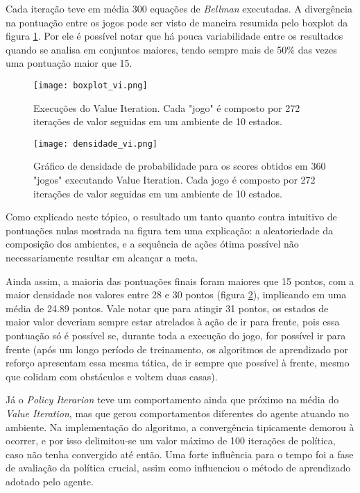 \documentclass[letterpaper]{article} %
\begin{document}
Cada iteração teve em média 300 equações de \textit{Bellman} executadas. A divergência na pontuação entre os jogos pode ser visto de maneira resumida pelo boxplot da figura \ref{fig:boxplot_vi}. Por ele é possível notar que há pouca variabilidade entre os resultados quando se analisa em conjuntos maiores, tendo sempre mais de 50\% das vezes uma pontuação maior que 15.

\begin{figure}[h]
	\center
	\texttt{[image: boxplot\_vi.png]}
    \caption{Execuções do Value Iteration. Cada "jogo" é composto por 272 iterações de valor seguidas em um ambiente de 10 estados.}
    \label{fig:boxplot_vi}
\end{figure}

\begin{figure}[h]
	\center
	\texttt{[image: densidade\_vi.png]}
    \caption{Gráfico de densidade de probabilidade para os scores obtidos em 360 "jogos" executando Value Iteration. Cada jogo é composto por 272 iterações de valor seguidas em um ambiente de 10 estados.}
    \label{fig:densidade_vi}
\end{figure}


Como explicado neste tópico, o resultado um tanto quanto contra intuitivo de pontuações nulas mostrada na figura tem uma explicação: a aleatoriedade da composição dos ambientes, e a sequência de ações ótima possível não necessariamente resultar em alcançar a meta.

Ainda assim, a maioria das pontuações finais foram maiores que 15 pontos, com a maior densidade nos valores entre 28 e 30 pontos (figura \ref{fig:densidade_vi}), implicando em uma média de 24.89 pontos. Vale notar que para atingir 31 pontos, os estados de maior valor deveriam sempre estar atrelados à ação de ir para frente, pois essa pontuação só é possível se, durante toda a execução do jogo, for possível ir para frente (após um longo período de treinamento, os algoritmos de aprendizado por reforço apresentam essa mesma tática, de ir sempre que possível à frente, mesmo que colidam com obstáculos e voltem duas casas).


Já o \textit{Policy Iterarion} teve um comportamento ainda que próximo na média do \textit{Value Iteration}, mas que gerou comportamentos diferentes do agente atuando no ambiente. Na implementação do algoritmo, a convergência tipicamente demorou à ocorrer, e por isso delimitou-se um valor máximo de 100 iterações de política, caso não tenha convergido até então. Uma forte influência para o tempo foi a fase de avaliação da política crucial, assim como influenciou o método de aprendizado adotado pelo agente. 
\end{document}
